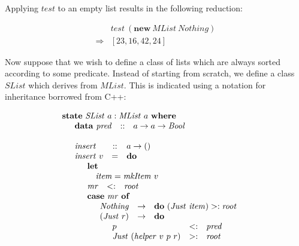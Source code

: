 \documentclass[runningheads,a4paper]{llncs}
\begin{document}
Applying $\mathit{test}$ to an empty list results in the following reduction:

\begin{displaymath}
\begin{array}{cl}
 & \mathit{test}~(\mathbf{new}~\mathit{MList}~\mathit{Nothing}) \\
\Rightarrow & [23,16,42,24]
\end{array}
\end{displaymath}

Now suppose that we wish to define a class of lists which are always sorted according to some predicate. Instead of starting from scratch, we define a class $\mathit{SList}$ which derives from $\mathit{MList}$. This is indicated using a notation for inheritance borrowed from C++:

\begin{displaymath}
\begin{array}{l}
\mathbf{state}~\mathit{SList}~a : \mathit{MList}~a~\mathbf{where} \\
\quad \begin{array}{lcl}
\mathbf{data}~\mathit{pred}  & :: & a \to a \to \mathit{Bool}
\end{array}\\\\
\quad \begin{array}{lcl}
\mathit{insert} & :: & a \to ()\\
\mathit{insert}~v & = & \mathbf{do} \\
\multicolumn{3}{l}{\quad \begin{array}{lcl}
\multicolumn{3}{l}{\mathbf{let}}\\
\multicolumn{3}{l}{\quad \mathit{item} = \mathit{mkItem}~v} \\
\mathit{mr} & <: & \mathit{root} \\
\multicolumn{3}{l}{\mathbf{case}~\mathit{mr}~\mathbf{of}} \\
\multicolumn{3}{l}{\quad \begin{array}{lcl}
\mathit{Nothing} & \to & \mathbf{do}~(\mathit{Just}~\mathit{item}) >: \mathit{root} \\
(\mathit{Just}~r) & \to & \mathbf{do} \\
\multicolumn{3}{l}{\quad \begin{array}{lcl}
p & <: & \mathit{pred} \\
\mathit{Just}~(\mathit{helper}~v~p~r) & >: & \mathit{root}
\end{array}}
\end{array}}
\end{array}}
\end{array}
\end{array}
\end{displaymath}
\end{document}

